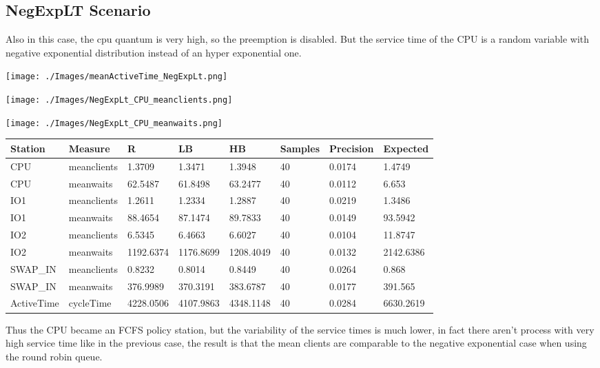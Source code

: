 \documentclass[12pt,a4paper]{article}
\begin{document}
\subsection{NegExpLT Scenario}

Also in this case, the cpu quantum is very high, so the preemption is disabled. But the service time of the CPU is a random variable with negative exponential distribution instead of an hyper exponential one.

\texttt{[image: ./Images/meanActiveTime\_NegExpLt.png]}

\texttt{[image: ./Images/NegExpLt\_CPU\_meanclients.png]}

\texttt{[image: ./Images/NegExpLt\_CPU\_meanwaits.png]}


\begin{table}[!ht]
    \centering
    \begin{tabular}{|l|l|l|l|l|l|l|l|}
    \hline
    Station & Measure & R & LB & HB & Samples & Precision & Expected \\ \hline
    CPU & meanclients & 1.3709 & 1.3471 & 1.3948 & 40 & 0.0174 & 1.4749 \\ \hline
    CPU & meanwaits & 62.5487 & 61.8498 & 63.2477 & 40 & 0.0112 & 6.653 \\ \hline
    IO1 & meanclients & 1.2611 & 1.2334 & 1.2887 & 40 & 0.0219 & 1.3486 \\ \hline
    IO1 & meanwaits & 88.4654 & 87.1474 & 89.7833 & 40 & 0.0149 & 93.5942 \\ \hline
    IO2 & meanclients & 6.5345 & 6.4663 & 6.6027 & 40 & 0.0104 & 11.8747 \\ \hline
    IO2 & meanwaits & 1192.6374 & 1176.8699 & 1208.4049 & 40 & 0.0132 & 2142.6386 \\ \hline
    SWAP\_IN & meanclients & 0.8232 & 0.8014 & 0.8449 & 40 & 0.0264 & 0.868 \\ \hline
    SWAP\_IN & meanwaits & 376.9989 & 370.3191 & 383.6787 & 40 & 0.0177 & 391.565 \\ \hline
    ActiveTime & cycleTime & 4228.0506 & 4107.9863 & 4348.1148 & 40 & 0.0284 & 6630.2619 \\ \hline
    \end{tabular}
\end{table}

Thus the CPU became an FCFS policy station, but the variability of the service times is much lower, in fact there aren't process with very high service time like in the previous case, the result is that the mean clients are comparable to the negative exponential case when using the round robin queue. 
\end{document}
